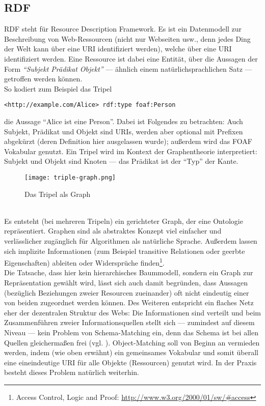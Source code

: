 \subsection{RDF}
RDF steht für Resource Description Framework. Es ist ein Datenmodell zur Beschreibung von Web-Ressourcen (nicht nur Webseiten usw., denn jedes Ding der Welt kann über eine URI identifiziert werden), welche über eine URI identifiziert werden. Eine Ressource ist dabei eine Entität, über die Aussagen der Form \textit{"`Subjekt Prädikat Objekt"'} --- ähnlich einem natürlichsprachlichen Satz --- getroffen werden können.\\
So kodiert zum Beispiel das Tripel \\
\begin{lstlisting}[style=N3]
<http://example.com/Alice> rdf:type foaf:Person
\end{lstlisting}
die Aussage ``Alice ist eine Person''. Dabei ist Folgendes zu betrachten: Auch Subjekt, Prädikat und Objekt sind URIs, werden aber optional mit Prefixen abgekürzt (deren Definition hier ausgelassen wurde); außerdem wird das FOAF Vokabular genutzt. Ein Tripel wird im Kontext der Graphentheorie interpretiert: Subjekt und Objekt sind Knoten --- das Prädikat ist der ``Typ'' der Kante.\\
\begin{figure}[h]
  \centering
    \texttt{[image: triple-graph.png]}
  \caption{Das Tripel als Graph}
  \label{fig:triple-graph}
\end{figure}
\\
Es entsteht (bei mehreren Tripeln) ein gerichteter Graph, der eine Ontologie repräsentiert. Graphen sind als abstraktes Konzept viel einfacher und verlässlicher zugänglich für Algorithmen als natürliche Sprache. Außerdem lassen sich implizite Informationen (zum Beispiel transitive Relationen oder geerbte Eigenschaften) ableiten oder Widersprüche finden\footnote{Access Control, Logic and Proof: \url{http://www.w3.org/2000/01/sw/#access}}.\\
Die Tatsache, dass hier kein hierarchisches Baummodell, sondern ein Graph zur Repräsentation gewählt wird, lässt sich auch damit begründen, dass Aussagen (bezüglich Beziehungen zweier Resourcen zueinander) oft nicht eindeutig einer von beiden zugeordnet werden können. Des Weiteren entspricht ein flaches Netz eher der dezentralen Struktur des Webs: Die Informationen sind verteilt und beim Zusammenführen zweier Informationsquellen stellt sich --- zumindest auf diesem Niveau --- kein Problem von Schema-Matching ein, denn das Schema ist bei allen Quellen gleichermaßen frei (vgl. \cite{hitzler}). Object-Matching soll von Beginn an vermieden werden, indem (wie oben erwähnt) ein gemeinsames Vokabular und somit überall eine eineindeutige URI für alle Objekte (Ressourcen) genutzt wird. In der Praxis besteht dieses Problem natürlich weiterhin.\\
